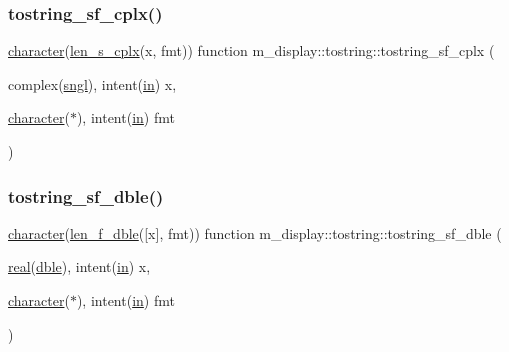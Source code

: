 \mbox{\label{interfacem__display_1_1tostring_ac01ed8027512191049535c16d79cecc7}} 
\subsubsection{\texorpdfstring{tostring\+\_\+sf\+\_\+cplx()}{tostring\_sf\_cplx()}}
{\footnotesize\ttfamily \hyperlink{option__stopwatch_83_8txt_abd4b21fbbd175834027b5224bfe97e66}{character}(\hyperlink{namespacem__display_a7b573fb0cba7c7c954a820cdfe1c7968}{len\+\_\+s\+\_\+cplx}(x, fmt)) function m\+\_\+display\+::tostring\+::tostring\+\_\+sf\+\_\+cplx (\begin{DoxyParamCaption}\item[{complex(\hyperlink{namespacem__display_a2ac86bc535c3ccc5947dbb3109c666b5}{sngl}), intent(\hyperlink{M__journal_83_8txt_afce72651d1eed785a2132bee863b2f38}{in})}]{x,  }\item[{\hyperlink{option__stopwatch_83_8txt_abd4b21fbbd175834027b5224bfe97e66}{character}($\ast$), intent(\hyperlink{M__journal_83_8txt_afce72651d1eed785a2132bee863b2f38}{in})}]{fmt }\end{DoxyParamCaption})\hspace{0.3cm}{\ttfamily [private]}}

\mbox{\label{interfacem__display_1_1tostring_a0772e8533026bf12240b1aa0f0801d51}} 
\subsubsection{\texorpdfstring{tostring\+\_\+sf\+\_\+dble()}{tostring\_sf\_dble()}}
{\footnotesize\ttfamily \hyperlink{option__stopwatch_83_8txt_abd4b21fbbd175834027b5224bfe97e66}{character}(\hyperlink{namespacem__display_aa013a639d5b0f7e40b627c9d712693f0}{len\+\_\+f\+\_\+dble}(\mbox{[}x\mbox{]}, fmt)) function m\+\_\+display\+::tostring\+::tostring\+\_\+sf\+\_\+dble (\begin{DoxyParamCaption}\item[{\hyperlink{read__watch_83_8txt_abdb62bde002f38ef75f810d3a905a823}{real}(\hyperlink{namespacem__display_a46d90b75b6ccef7ccade133e5847e815}{dble}), intent(\hyperlink{M__journal_83_8txt_afce72651d1eed785a2132bee863b2f38}{in})}]{x,  }\item[{\hyperlink{option__stopwatch_83_8txt_abd4b21fbbd175834027b5224bfe97e66}{character}($\ast$), intent(\hyperlink{M__journal_83_8txt_afce72651d1eed785a2132bee863b2f38}{in})}]{fmt }\end{DoxyParamCaption})\hspace{0.3cm}{\ttfamily [private]}}

